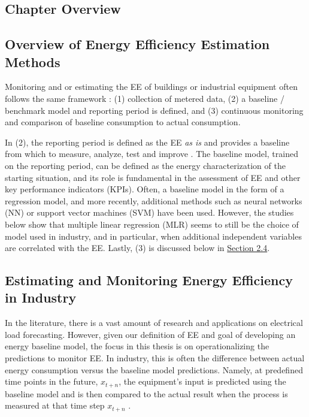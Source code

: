 \subsection{Chapter Overview}

\subsection{Overview of Energy Efficiency Estimation Methods}

Monitoring and or estimating the EE of buildings or industrial equipment often follows the same framework \cite{kini_methodology_2011}: (1) collection of metered data, (2) a baseline / benchmark model and reporting period is defined, and (3) continuous monitoring and comparison of baseline consumption to actual consumption. 

In (2), the reporting period is defined as the EE \textit{as is} and provides a baseline from which to measure, analyze, test and improve \cite{oakland_statistical_2008}. The baseline model, trained on the reporting period, can be defined as the energy characterization of the starting situation, and its role is fundamental in the assessment of EE and other key performance indicators (KPIs). Often, a baseline model in the form of a regression model, and more recently, additional methods such as neural networks (NN) or support vector machines (SVM) have been used. However, the studies below show that multiple linear regression (MLR) seems to still be the choice of model used in industry, and in particular, when additional independent variables are correlated with the EE. Lastly, (3) is discussed below in \hyperlink{subsection.2.4}{Section 2.4}.

\subsection{Estimating and Monitoring Energy Efficiency in Industry}

In the literature, there is a vast amount of research and applications on electrical load forecasting. However, given our definition of EE and goal of developing an energy baseline model, the focus in this thesis is on operationalizing the predictions to monitor EE. In industry, this is often the difference between actual energy consumption versus the baseline model predictions. Namely, at predefined time points in the future, $x_{t+n}$, the equipment's input is predicted using the baseline model and is then compared to the actual result when the process is measured at that time step $x_{t+n}$ \cite{tightening}. 

